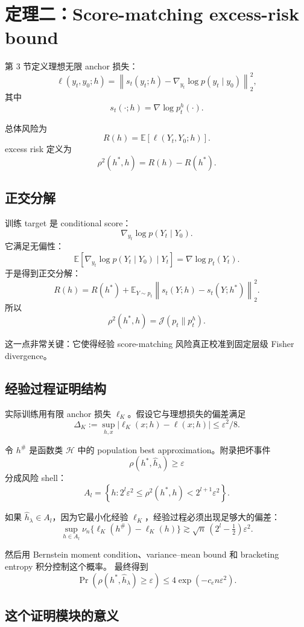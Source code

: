 \documentclass[UTF8,11pt]{ctexart}
\newcommand{\E}{\mathbb{E}}
\newcommand{\cH}{\mathcal{H}}
\begin{document}
\section{定理二：Score-matching excess-risk bound}

第 3 节定义理想无限 anchor 损失：
\[
\ell(y_t,y_0;h)
=
\left\|
s_t(y_t;h)
-
\nabla_{y_t}\log p(y_t\mid y_0)
\right\|_2^2,
\]
其中
\[
s_t(\cdot;h)=\nabla\log p_t^h(\cdot).
\]

总体风险为
\[
R(h)=\E[\ell(Y_t,Y_0;h)].
\]
excess risk 定义为
\[
\rho^2(h^*,h)
=
R(h)-R(h^*).
\]

\subsection{正交分解}

训练 target 是 conditional score：
\[
\nabla_{y_t}\log p(Y_t\mid Y_0).
\]
它满足无偏性：
\[
\E[
\nabla_{y_t}\log p(Y_t\mid Y_0)
\mid Y_t
]
=
\nabla\log p_t(Y_t).
\]
于是得到正交分解：
\[
R(h)
=
R(h^*)
+
\E_{Y\sim p_t}
\left\|
s_t(Y;h)-s_t(Y;h^*)
\right\|_2^2.
\]
所以
\[
\rho^2(h^*,h)
=
\mathcal J(p_t\|p_t^h).
\]

这一点非常关键：它使得经验 score-matching 风险真正校准到固定层级 Fisher divergence。

\subsection{经验过程证明结构}

实际训练用有限 anchor 损失 \(\ell_K\)。假设它与理想损失的偏差满足
\[
\Delta_K
:=
\sup_{h,x}|\ell_K(x;h)-\ell(x;h)|
\le
\varepsilon^2/8.
\]

令 \(h^\#\) 是函数类 \(\cH\) 中的 population best approximation。附录把坏事件
\[
\rho(h^*,\hat h_\lambda)\ge\varepsilon
\]
分成风险 shell：
\[
A_l
=
\left\{
h:
2^l\varepsilon^2
\le
\rho^2(h^*,h)
<
2^{l+1}\varepsilon^2
\right\}.
\]

如果 \(\hat h_\lambda\in A_l\)，因为它最小化经验 \(\ell_K\)，经验过程必须出现足够大的偏差：
\[
\sup_{h\in A_l}
\nu_n\{\ell_K(h^\#)-\ell_K(h)\}
\gtrsim
\sqrt n\,(2^l-\tfrac12)\varepsilon^2.
\]

然后用 Bernstein moment condition、variance--mean bound 和 bracketing entropy 积分控制这个概率。
最终得到
\[
\Pr\left(
\rho(h^*,\hat h_\lambda)\ge\varepsilon
\right)
\le
4\exp(-c_en\varepsilon^2).
\]

\subsection{这个证明模块的意义}
\end{document}
